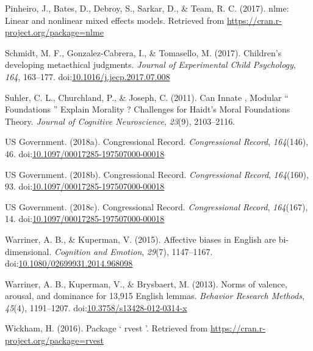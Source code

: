 \documentclass[english,,man]{apa6}
\begin{document}
\leavevmode\hypertarget{ref-Pinheiro2017}{}%
Pinheiro, J., Bates, D., Debroy, S., Sarkar, D., \& Team, R. C. (2017). nlme: Linear and nonlinear mixed effects models. Retrieved from \url{https://cran.r-project.org/package=nlme}

\leavevmode\hypertarget{ref-Schmidt2017}{}%
Schmidt, M. F., Gonzalez-Cabrera, I., \& Tomasello, M. (2017). Children's developing metaethical judgments. \emph{Journal of Experimental Child Psychology}, \emph{164}, 163--177. doi:\href{https://doi.org/10.1016/j.jecp.2017.07.008}{10.1016/j.jecp.2017.07.008}

\leavevmode\hypertarget{ref-Suhler2011}{}%
Suhler, C. L., Churchland, P., \& Joseph, C. (2011). Can Innate , Modular `` Foundations '' Explain Morality ? Challenges for Haidt's Moral Foundations Theory. \emph{Journal of Cognitive Neuroscience}, \emph{23}(9), 2103--2116.

\leavevmode\hypertarget{ref-USGovernment2018b}{}%
US Government. (2018a). Congressional Record. \emph{Congressional Record}, \emph{164}(146), 46. doi:\href{https://doi.org/10.1097/00017285-197507000-00018}{10.1097/00017285-197507000-00018}

\leavevmode\hypertarget{ref-USGovernment2018}{}%
US Government. (2018b). Congressional Record. \emph{Congressional Record}, \emph{164}(160), 93. doi:\href{https://doi.org/10.1097/00017285-197507000-00018}{10.1097/00017285-197507000-00018}

\leavevmode\hypertarget{ref-USGovernment2018a}{}%
US Government. (2018c). Congressional Record. \emph{Congressional Record}, \emph{164}(167), 14. doi:\href{https://doi.org/10.1097/00017285-197507000-00018}{10.1097/00017285-197507000-00018}

\leavevmode\hypertarget{ref-Warriner2015}{}%
Warriner, A. B., \& Kuperman, V. (2015). Affective biases in English are bi-dimensional. \emph{Cognition and Emotion}, \emph{29}(7), 1147--1167. doi:\href{https://doi.org/10.1080/02699931.2014.968098}{10.1080/02699931.2014.968098}

\leavevmode\hypertarget{ref-Warriner2013}{}%
Warriner, A. B., Kuperman, V., \& Brysbaert, M. (2013). Norms of valence, arousal, and dominance for 13,915 English lemmas. \emph{Behavior Research Methods}, \emph{45}(4), 1191--1207. doi:\href{https://doi.org/10.3758/s13428-012-0314-x}{10.3758/s13428-012-0314-x}

\leavevmode\hypertarget{ref-Wickham2016}{}%
Wickham, H. (2016). Package ` rvest '. Retrieved from \url{https://cran.r-project.org/package=rvest}
\end{document}
